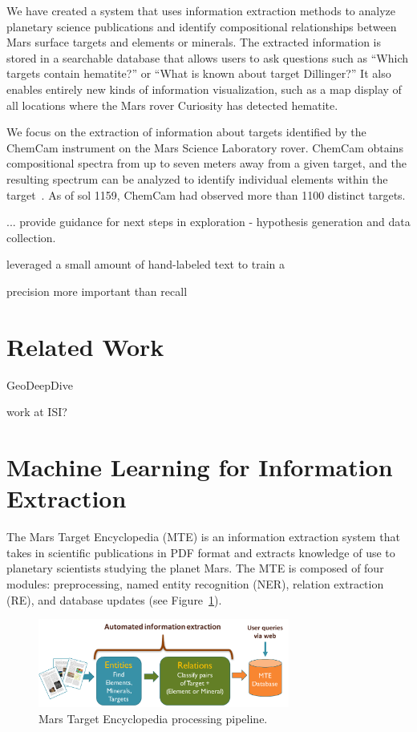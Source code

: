 \documentclass[letterpaper]{article} %
\begin{document}
We have created a system that uses information extraction methods to
analyze planetary science publications and identify compositional
relationships between Mars surface targets and elements or minerals.
The extracted information is stored in a searchable database that
allows users to ask questions such as ``Which targets contain
hematite?'' or ``What is known about target Dillinger?''  It also
enables entirely new kinds of information visualization, such as a map
display of all locations where the Mars rover Curiosity has detected
hematite. 

We focus on the extraction of information about targets identified by
the ChemCam instrument on the Mars Science Laboratory rover.  ChemCam
obtains compositional spectra from up to seven meters away from a
given target, and the resulting spectrum can be analyzed to identify
individual elements within the target~\cite{maurice:chemcam12}.  As of
sol 1159, ChemCam had observed more than 1100 distinct targets.

... provide guidance for next steps in exploration 
- hypothesis generation and data collection.

leveraged a small amount of hand-labeled text to train a

precision more important than recall

\section{Related Work}

GeoDeepDive

work at ISI?

\section{Machine Learning for Information Extraction}

The Mars Target Encyclopedia (MTE) is an information extraction system
that takes in scientific publications in PDF format and extracts
knowledge of use to planetary scientists studying the planet Mars.
The MTE is composed of four modules: preprocessing, named entity
recognition (NER), relation extraction (RE), and database updates (see
Figure~\ref{fig:mte}).

\begin{figure}
\begin{center}
\includegraphics[width=3.25in]{fig/system.pdf}
\end{center}
\caption{Mars Target Encyclopedia processing pipeline.}
\label{fig:mte}
\end{figure}
\end{document}
